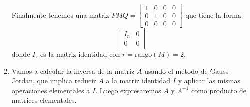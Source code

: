 \begin{enumerate}[label=\color{red}\textbf{\arabic*)}]
Finalmente tenemos una matriz $PMQ=\begin{bmatrix} 
    1 & 0 & 0 & 0\\
    0 & 1 & 0 & 0\\
    0 & 0 & 0 & 0
    \end{bmatrix}$ que tiene la forma \[
\left[ \begin{array}{c|c}
        I_n & 0\\ \hline
        0 & 0
\end{array} \right] 
\] donde $I_r$ es la matriz identidad con  $r=\mathrm{rango}(M)=2$.

    \item {} 

    Vamos a calcular la inversa de la matriz $A$ usando el método de Gauss-Jordan, que implica reducir $A$ a la matriz identidad $I$ y aplicar las mismas operaciones elementales a $I$. Luego expresaremos $A$ y $A^{-1}$ como producto de matrices elementales.


\end{enumerate}
